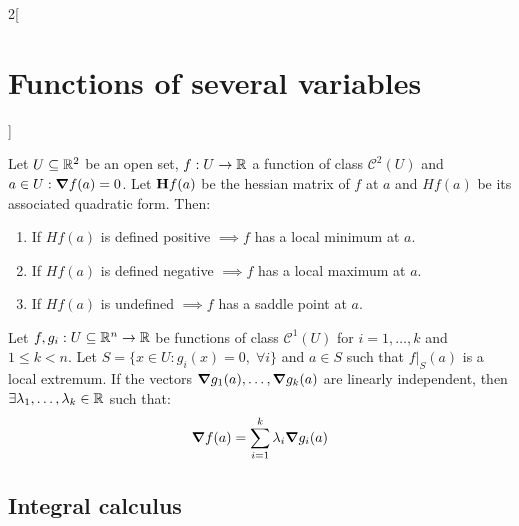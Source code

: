 \documentclass[../../../main.tex]{subfiles}
\begin{document}
\begin{multicols}{2}[\section{Functions of several variables}]
\begin{prop}
    \end{prop}
    \begin{theorem}
        Let $U\subseteq\mathbb{R}^2$ be an open set, $f:U\rightarrow\mathbb{R} $ a function of class $\mathcal{C}^2(U)$ and $a\in U:\grad f(a)=0$. Let $\boldsymbol{\mathrm{H}}f(a)$ be the hessian matrix of $f$ at $a$ and $Hf(a)$ be its associated quadratic form. Then:
        \begin{enumerate}
            \item If $Hf(a)$ is defined positive $\implies f$ has a local minimum at $a$.
            \item If $Hf(a)$ is defined negative $\implies f$ has a local maximum at $a$.
            \item If $Hf(a)$ is undefined $\implies f$ has a saddle point at $a$.
        \end{enumerate}
    \end{theorem}
    \begin{theorem}
        Let $f,g_i:U\subseteq\mathbb{R}^n\rightarrow\mathbb{R} $ be functions of class $\mathcal{C}^1(U)$ for $i=1,\ldots,k$ and $1\leq k<n$. Let $S=\{x\in U:g_i(x)=0,\;\forall i\}$ and $a\in S$ such that $f|_S(a)$ is a local extremum. If the vectors $\grad g_1(a),\ldots,\grad g_k(a)$ are linearly independent, then $\exists\lambda_1,\ldots,\lambda_k\in\mathbb{R} $ such that: $$\grad f(a)=\sum_{i=1}^k\lambda_i\grad g_i(a)$$
    \end{theorem}
    \subsection{Integral calculus}

\end{multicols}
\end{document}

